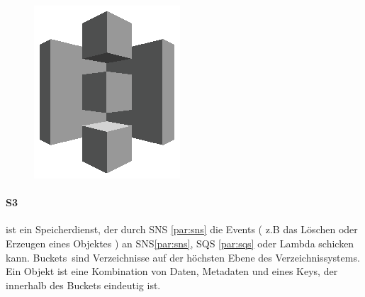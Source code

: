 \documentclass[
12pt,
english,
ngerman,
headsepline,
twoside,
openright,
numbers=noenddot,version=first
]{scrreprt}
\begin{document}
\begin{figure}
	\includegraphics[width=0.9\linewidth]{./pics/aws/Storage_GRAYSCALE_AmazonS3.eps}
\end{figure}
\paragraph{\acrfull{S3}} ist ein Speicherdienst, der durch \acrshort{SNS} \ref{par:sns} die Events ( z.B das Löschen oder Erzeugen eines Objektes ) an \acrshort{SNS}\ref{par:sns}, \acrfull{SQS} \ref{par:sqs} oder Lambda schicken kann. \glqq Buckets\grqq\ sind Verzeichnisse auf der höchsten Ebene des Verzeichnissystems. Ein Objekt ist eine Kombination von Daten, Metadaten und eines Keys, der innerhalb des Buckets eindeutig ist.
\end{document}
